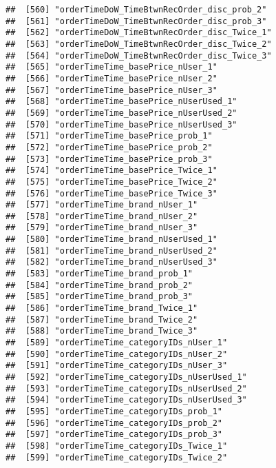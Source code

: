 \documentclass[10pt]{report}
\begin{document}
\begin{verbatim}
##  [560] "orderTimeDoW_TimeBtwnRecOrder_disc_prob_2"            
##  [561] "orderTimeDoW_TimeBtwnRecOrder_disc_prob_3"            
##  [562] "orderTimeDoW_TimeBtwnRecOrder_disc_Twice_1"           
##  [563] "orderTimeDoW_TimeBtwnRecOrder_disc_Twice_2"           
##  [564] "orderTimeDoW_TimeBtwnRecOrder_disc_Twice_3"           
##  [565] "orderTimeTime_basePrice_nUser_1"                      
##  [566] "orderTimeTime_basePrice_nUser_2"                      
##  [567] "orderTimeTime_basePrice_nUser_3"                      
##  [568] "orderTimeTime_basePrice_nUserUsed_1"                  
##  [569] "orderTimeTime_basePrice_nUserUsed_2"                  
##  [570] "orderTimeTime_basePrice_nUserUsed_3"                  
##  [571] "orderTimeTime_basePrice_prob_1"                       
##  [572] "orderTimeTime_basePrice_prob_2"                       
##  [573] "orderTimeTime_basePrice_prob_3"                       
##  [574] "orderTimeTime_basePrice_Twice_1"                      
##  [575] "orderTimeTime_basePrice_Twice_2"                      
##  [576] "orderTimeTime_basePrice_Twice_3"                      
##  [577] "orderTimeTime_brand_nUser_1"                          
##  [578] "orderTimeTime_brand_nUser_2"                          
##  [579] "orderTimeTime_brand_nUser_3"                          
##  [580] "orderTimeTime_brand_nUserUsed_1"                      
##  [581] "orderTimeTime_brand_nUserUsed_2"                      
##  [582] "orderTimeTime_brand_nUserUsed_3"                      
##  [583] "orderTimeTime_brand_prob_1"                           
##  [584] "orderTimeTime_brand_prob_2"                           
##  [585] "orderTimeTime_brand_prob_3"                           
##  [586] "orderTimeTime_brand_Twice_1"                          
##  [587] "orderTimeTime_brand_Twice_2"                          
##  [588] "orderTimeTime_brand_Twice_3"                          
##  [589] "orderTimeTime_categoryIDs_nUser_1"                    
##  [590] "orderTimeTime_categoryIDs_nUser_2"                    
##  [591] "orderTimeTime_categoryIDs_nUser_3"                    
##  [592] "orderTimeTime_categoryIDs_nUserUsed_1"                
##  [593] "orderTimeTime_categoryIDs_nUserUsed_2"                
##  [594] "orderTimeTime_categoryIDs_nUserUsed_3"                
##  [595] "orderTimeTime_categoryIDs_prob_1"                     
##  [596] "orderTimeTime_categoryIDs_prob_2"                     
##  [597] "orderTimeTime_categoryIDs_prob_3"                     
##  [598] "orderTimeTime_categoryIDs_Twice_1"                    
##  [599] "orderTimeTime_categoryIDs_Twice_2"                    

\end{verbatim}
\end{document}

